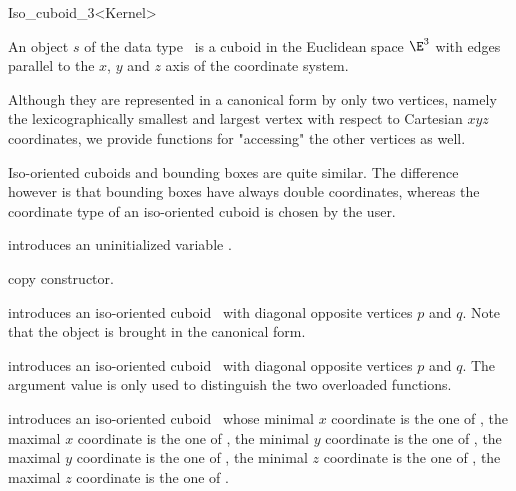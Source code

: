 \begin{ccRefClass} {Iso_cuboid_3<Kernel>}

\ccDefinition  An object $s$ of the data type \ccRefName\ is a
cuboid in the Euclidean space $\E^3$ with edges parallel to the $x$,
$y$ and $z$ axis of the coordinate system.
 
Although they are represented in a canonical form by only two
vertices, namely the lexicographically smallest and largest vertex
with respect to Cartesian $xyz$ coordinates, we provide
functions for "accessing" the other vertices as well.

Iso-oriented cuboids and bounding boxes are quite similar. The
difference however is that bounding boxes have always double coordinates, 
whereas the coordinate type of an iso-oriented cuboid is chosen by
the user.

\ccCreation
{}

\ccHidden {}
             {introduces an uninitialized variable \ccVar.}

\ccHidden {}
            {copy constructor.}

            {introduces an iso-oriented cuboid \ccVar\ with diagonal
             opposite vertices $p$ and $q$. Note that the object is 
             brought in the canonical form.}

            {introduces an iso-oriented cuboid \ccVar\ with diagonal
             opposite vertices $p$ and $q$.  The  argument value
             is only used to distinguish the two overloaded functions.
             }

            {introduces an iso-oriented cuboid \ccVar\ whose
             minimal $x$ coordinate is the one of , the
             maximal $x$ coordinate is the one of , the
             minimal $y$ coordinate is the one of , the
             maximal $y$ coordinate is the one of , the
             minimal $z$ coordinate is the one of , the
             maximal $z$ coordinate is the one of .}


\end{ccRefClass}
